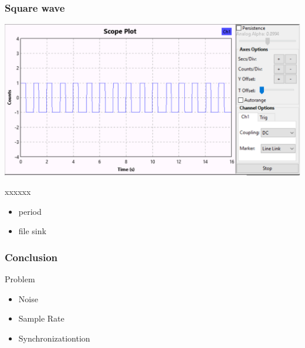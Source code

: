 \begin{frame}
	\frametitle{Square wave}
	\centering \includegraphics[scale=.2]{images/apres_add_const.png}
	\begin{block}{xxxxxx}
		\begin{itemize}
			\item period
			\item file sink
		\end{itemize}
	\end{block}
\end{frame}

\begin{frame}
	\frametitle{Conclusion}
	\begin{block}{Problem}
		\begin{itemize}
			\item Noise
			\item Sample Rate
			\item Synchronizationtion
		\end{itemize}
	\end{block}
\end{frame}
